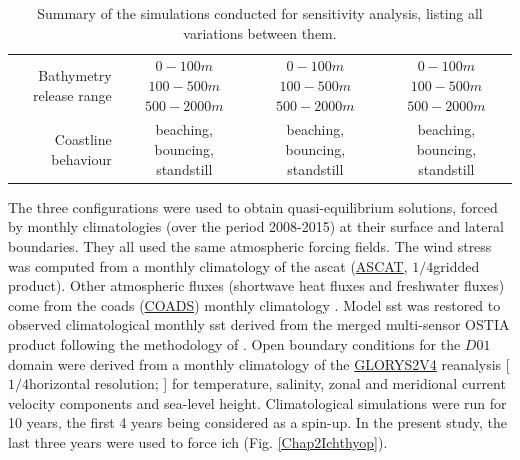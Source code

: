 \begin{table}[H]
\begin{tabular}{r|c|c|c}
Bathymetry release range            &
	\makecell{$0-100 m$ \\ $100-500 m$ \\ $500-2000 m$}&
	\makecell{$0-100 m$ \\ $100-500 m$ \\ $500-2000 m$}&
	\makecell{$0-100 m$ \\ $100-500 m$ \\ $500-2000 m$}\\
Coastline behaviour								&
	\makecell{beaching,\\bouncing,\\standstill}&
	\makecell{beaching,\\bouncing,\\standstill}&
	\makecell{beaching,\\bouncing,\\standstill}\\
\hline
\end{tabular}
\caption{Summary of the simulations conducted for sensitivity analysis, listing all variations between them.}
\label{TabSimus}
\end{table}

The three configurations were used to obtain quasi-equilibrium solutions, forced by monthly climatologies (over the period 2008-2015) at their surface and lateral boundaries. They all used the same atmospheric forcing fields. The wind stress was computed from a monthly climatology of the \acrlong{ascat} (\href{https://www.ospo.noaa.gov/Products/atmosphere/ascat/}{ASCAT}, $1/4$\textdegree gridded product). Other atmospheric fluxes (shortwave heat fluxes and freshwater fluxes) come from the \acrlong{coads} (\href{https://repository.library.noaa.gov/view/noaa/49337}{COADS}) monthly climatology \citep{DasiYoun1994}. Model \acrfull{sst} was restored to observed climatological monthly \acrshort{sst} derived from the merged multi-sensor OSTIA product \citep{DonlMart2012} following the methodology of \citep{BarnSief1995}. Open boundary conditions for the $D01$ domain were derived from a monthly climatology of the \href{https://www.mercator-ocean.eu/en/ocean-science/glorys/}{GLORYS2V4} reanalysis [$1/4$\textdegree horizontal resolution; \citep{FerrPare2012}] for temperature, salinity, zonal and meridional current velocity components and sea-level height. Climatological simulations were run for 10 years, the first 4 years being considered as a spin-up. In the present study, the last three years were used to force \gls{ich} (Fig. \ref{Chap2Ichthyop}).\\

